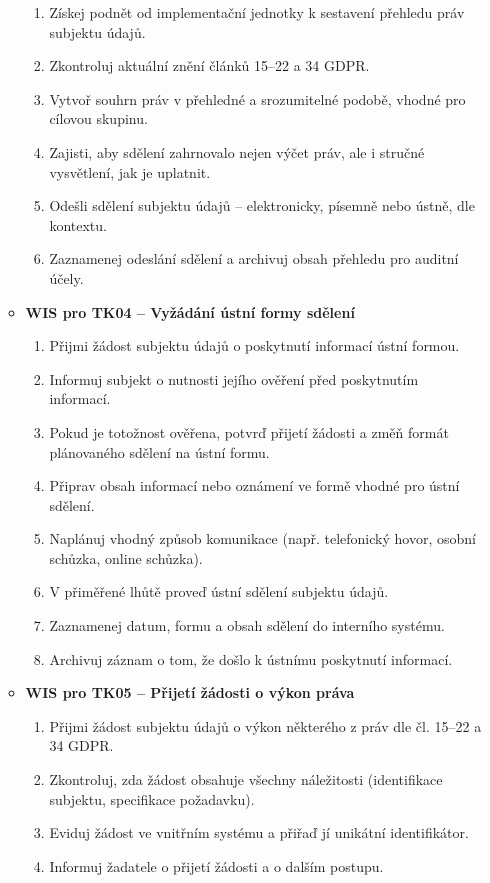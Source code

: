 \begin{itemize}
\begin{itemize}
    \begin{enumerate}
      \item Získej podnět od implementační jednotky k sestavení přehledu práv subjektu údajů.
      \item Zkontroluj aktuální znění článků 15–22 a 34 GDPR.
      \item Vytvoř souhrn práv v přehledné a srozumitelné podobě, vhodné pro cílovou skupinu.
      \item Zajisti, aby sdělení zahrnovalo nejen výčet práv, ale i stručné vysvětlení, jak je uplatnit.
      \item Odešli sdělení subjektu údajů – elektronicky, písemně nebo ústně, dle kontextu.
      \item Zaznamenej odeslání sdělení a archivuj obsah přehledu pro auditní účely.
    \end{enumerate}

    \item \textbf{WIS pro TK04 – Vyžádání ústní formy sdělení}

  \begin{enumerate}
    \item Přijmi žádost subjektu údajů o poskytnutí informací ústní formou.
    \item Informuj subjekt o nutnosti jejího ověření před poskytnutím informací.
    \item Pokud je totožnost ověřena, potvrď přijetí žádosti a změň formát plánovaného sdělení na ústní formu.
    \item Připrav obsah informací nebo oznámení ve formě vhodné pro ústní sdělení.
    \item Naplánuj vhodný způsob komunikace (např. telefonický hovor, osobní schůzka, online schůzka).
    \item V přiměřené lhůtě proveď ústní sdělení subjektu údajů.
    \item Zaznamenej datum, formu a obsah sdělení do interního systému.
    \item Archivuj záznam o tom, že došlo k ústnímu poskytnutí informací.
  \end{enumerate}

  \item \textbf{WIS pro TK05 – Přijetí žádosti o výkon práva}
  \begin{enumerate}
    \item Přijmi žádost subjektu údajů o výkon některého z práv dle čl. 15–22 a 34 GDPR.
    \item Zkontroluj, zda žádost obsahuje všechny náležitosti (identifikace subjektu, specifikace požadavku).
    \item Eviduj žádost ve vnitřním systému a přiřaď jí unikátní identifikátor.
    \item Informuj žadatele o přijetí žádosti a o dalším postupu.
  \end{enumerate}


\end{itemize}
\end{itemize}
